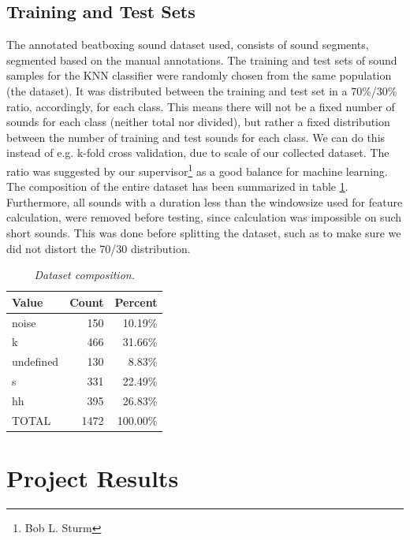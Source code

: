	\subsection{Training and Test Sets}
		The annotated beatboxing sound dataset used, consists of sound segments, segmented based on the manual annotations. The training and test sets of sound samples for the KNN classifier were randomly chosen from the same population (the dataset). It was distributed between the training and test set in a 70\%/30\% ratio, accordingly, for each class. This means there will not be a fixed number of sounds for each class (neither total nor divided), but rather a fixed distribution between the number of training and test sounds for each class. We can do this instead of e.g. k-fold cross validation, due to scale of our collected dataset. The ratio was suggested by our supervisor\footnote{Bob L. Sturm} as a good balance for machine learning. The composition of the entire dataset has been summarized in table \ref{table:eval:datasetComposition}. 
		Furthermore, all sounds with a duration less than the windowsize used for feature calculation, were removed before testing, since calculation was impossible on such short sounds. This was done before splitting the dataset, such as to make sure we did not distort the 70/30 distribution.

		\begin{table}
			\centering
			\begin{tabular}{|l|r|r|}
					\hline
					Value  &  Count  & Percent \\ \hline
			      noise    &  150    & 10.19\% \\ \hline
			          k    &  466    & 31.66\% \\ \hline
			  undefined    &  130    &  8.83\% \\ \hline
			          s    &  331    & 22.49\% \\ \hline
			         hh    &  395    & 26.83\% \\ \hline
			      TOTAL    &  1472	 & 100.00\% \\ \hline

			\end{tabular}
			\caption{\textit{{\footnotesize Dataset composition.}}}
			\label{table:eval:datasetComposition}
		\end{table}	
			
 
\section{Project Results}
	
